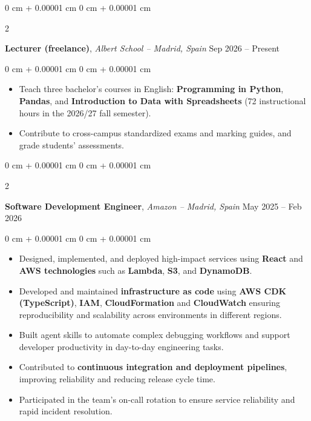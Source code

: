 \documentclass[10pt, letterpaper]{article}
\newenvironment{highlights}{
    \begin{itemize}[
        topsep=0.10 cm,
        parsep=0.10 cm,
        partopsep=0pt,
        itemsep=0pt,
        leftmargin=0 cm + 10pt
    ]
}{
    \end{itemize}
} %
\newenvironment{onecolentry}{
    \begin{adjustwidth}{
        0 cm + 0.00001 cm
    }{
        0 cm + 0.00001 cm
    }
}{
    \end{adjustwidth}
} %
\newenvironment{twocolentry}[2][]{
    \onecolentry
    \def\secondColumn{#2}
    \setcolumnwidth{\fill, 4.5 cm}
    \begin{paracol}{2}
}{
    \switchcolumn \raggedleft \secondColumn
    \end{paracol}
    \endonecolentry
} %
\begin{document}
        \vspace{0.2 cm}

        \begin{twocolentry}{
            Sep 2026 – Present
        }
            \textbf{Lecturer (freelance)}, \textit{Albert School -- Madrid, Spain} \end{twocolentry}

        \vspace{0.10 cm}
        \begin{onecolentry}
            \begin{highlights}
                \item Teach three bachelor's courses in English: \textbf{Programming in Python}, \textbf{Pandas}, and \textbf{Introduction to Data with Spreadsheets} (72 instructional hours in the 2026/27 fall semester).
                \item Contribute to cross-campus standardized exams and marking guides, and grade students' assessments.
            \end{highlights}
        \end{onecolentry}

        \vspace{0.2 cm}

        \begin{twocolentry}{
            May 2025 – Feb 2026
        }
            \textbf{Software Development Engineer}, \textit{Amazon -- Madrid, Spain} \end{twocolentry}

        \vspace{0.10 cm}
        \begin{onecolentry}
            \begin{highlights}
                \item Designed, implemented, and deployed high-impact services using \textbf{React} and \textbf{AWS technologies} such as \textbf{Lambda}, \textbf{S3}, and \textbf{DynamoDB}.
                \item Developed and maintained \textbf{infrastructure as code} using \textbf{AWS CDK (TypeScript)}, \textbf{IAM}, \textbf{CloudFormation} and \textbf{CloudWatch} ensuring reproducibility and scalability across environments in different regions.
                \item Built agent skills to automate complex debugging workflows and support developer productivity in day-to-day engineering tasks.
                \item Contributed to \textbf{continuous integration and deployment pipelines}, improving reliability and reducing release cycle time.
                \item Participated in the team’s on-call rotation to ensure service reliability and rapid incident resolution.
            \end{highlights}
        \end{onecolentry}
        
\end{document}
